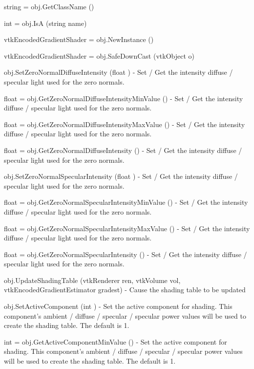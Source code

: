 \begin{DoxyItemize}
\item {\ttfamily string = obj.\-Get\-Class\-Name ()}  
\item {\ttfamily int = obj.\-Is\-A (string name)}  
\item {\ttfamily vtk\-Encoded\-Gradient\-Shader = obj.\-New\-Instance ()}  
\item {\ttfamily vtk\-Encoded\-Gradient\-Shader = obj.\-Safe\-Down\-Cast (vtk\-Object o)}  
\item {\ttfamily obj.\-Set\-Zero\-Normal\-Diffuse\-Intensity (float )} -\/ Set / Get the intensity diffuse / specular light used for the zero normals.  
\item {\ttfamily float = obj.\-Get\-Zero\-Normal\-Diffuse\-Intensity\-Min\-Value ()} -\/ Set / Get the intensity diffuse / specular light used for the zero normals.  
\item {\ttfamily float = obj.\-Get\-Zero\-Normal\-Diffuse\-Intensity\-Max\-Value ()} -\/ Set / Get the intensity diffuse / specular light used for the zero normals.  
\item {\ttfamily float = obj.\-Get\-Zero\-Normal\-Diffuse\-Intensity ()} -\/ Set / Get the intensity diffuse / specular light used for the zero normals.  
\item {\ttfamily obj.\-Set\-Zero\-Normal\-Specular\-Intensity (float )} -\/ Set / Get the intensity diffuse / specular light used for the zero normals.  
\item {\ttfamily float = obj.\-Get\-Zero\-Normal\-Specular\-Intensity\-Min\-Value ()} -\/ Set / Get the intensity diffuse / specular light used for the zero normals.  
\item {\ttfamily float = obj.\-Get\-Zero\-Normal\-Specular\-Intensity\-Max\-Value ()} -\/ Set / Get the intensity diffuse / specular light used for the zero normals.  
\item {\ttfamily float = obj.\-Get\-Zero\-Normal\-Specular\-Intensity ()} -\/ Set / Get the intensity diffuse / specular light used for the zero normals.  
\item {\ttfamily obj.\-Update\-Shading\-Table (vtk\-Renderer ren, vtk\-Volume vol, vtk\-Encoded\-Gradient\-Estimator gradest)} -\/ Cause the shading table to be updated  
\item {\ttfamily obj.\-Set\-Active\-Component (int )} -\/ Set the active component for shading. This component's ambient / diffuse / specular / specular power values will be used to create the shading table. The default is 1.  
\item {\ttfamily int = obj.\-Get\-Active\-Component\-Min\-Value ()} -\/ Set the active component for shading. This component's ambient / diffuse / specular / specular power values will be used to create the shading table. The default is 1.  

\end{DoxyItemize}
